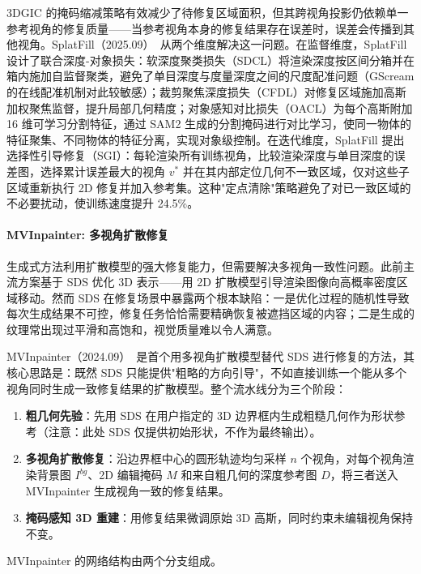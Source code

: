 3DGIC 的掩码缩减策略有效减少了待修复区域面积，但其跨视角投影仍依赖单一参考视角的修复质量——当参考视角本身的修复结果存在误差时，误差会传播到其他视角。SplatFill（2025.09）~\cite{2509_07809}从两个维度解决这一问题。在监督维度，SplatFill 设计了联合深度-对象损失：软深度聚类损失（SDCL）将渲染深度按区间分箱并在箱内施加自监督聚类，避免了单目深度与度量深度之间的尺度配准问题（GScream 的在线配准机制对此较敏感）；裁剪聚焦深度损失（CFDL）对修复区域施加高斯加权聚焦监督，提升局部几何精度；对象感知对比损失（OACL）为每个高斯附加 16 维可学习分割特征，通过 SAM2 生成的分割掩码进行对比学习，使同一物体的特征聚集、不同物体的特征分离，实现对象级控制。在迭代维度，SplatFill 提出选择性引导修复（SGI）：每轮渲染所有训练视角，比较渲染深度与单目深度的误差图，选择累计误差最大的视角 $v^*$ 并在其内部定位几何不一致区域，仅对这些子区域重新执行 2D 修复并加入参考集。这种"定点清除"策略避免了对已一致区域的不必要扰动，使训练速度提升 24.5\%。

\paragraph{MVInpainter: 多视角扩散修复}

生成式方法利用扩散模型的强大修复能力，但需要解决多视角一致性问题。此前主流方案基于 SDS 优化 3D 表示——用 2D 扩散模型引导渲染图像向高概率密度区域移动。然而 SDS 在修复场景中暴露两个根本缺陷：一是优化过程的随机性导致每次生成结果不可控，修复任务恰恰需要精确恢复被遮挡区域的内容；二是生成的纹理常出现过平滑和高饱和，视觉质量难以令人满意。

MVInpainter（2024.09）~\cite{2409_16938}是首个用多视角扩散模型替代 SDS 进行修复的方法，其核心思路是：既然 SDS 只能提供"粗略的方向引导"，不如直接训练一个能从多个视角同时生成一致修复结果的扩散模型。整个流水线分为三个阶段：

\begin{enumerate}
\item \textbf{粗几何先验}：先用 SDS 在用户指定的 3D 边界框内生成粗糙几何作为形状参考（注意：此处 SDS 仅提供初始形状，不作为最终输出）。
\item \textbf{多视角扩散修复}：沿边界框中心的圆形轨迹均匀采样 $n$ 个视角，对每个视角渲染背景图 $I^{bg}$、2D 编辑掩码 $M$ 和来自粗几何的深度参考图 $D$，将三者送入 MVInpainter 生成视角一致的修复结果。
\item \textbf{掩码感知 3D 重建}：用修复结果微调原始 3D 高斯，同时约束未编辑视角保持不变。
\end{enumerate}

MVInpainter 的网络结构由两个分支组成。

